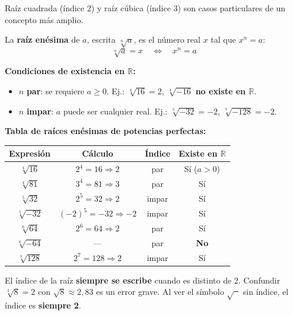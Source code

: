\documentclass[11pt, letterpaper]{article}
\begin{document}
Raíz cuadrada (índice 2) y raíz cúbica (índice 3) son casos particulares de un concepto más amplio.

\begin{tcolorbox}[importantbox, title={Definición formal de raíz enésima}]
La \textbf{raíz enésima} de $a$, escrita $\sqrt[n]{a}$, es el número real $x$ tal que $x^n = a$:
$$\sqrt[n]{a} = x \quad \Longleftrightarrow \quad x^n = a$$

\textbf{Condiciones de existencia en $\mathbb{R}$:}
\begin{itemize}
  \item $n$ \textbf{par}: se requiere $a \geq 0$. \quad Ej.: $\sqrt[4]{16}=2$, \; $\sqrt[4]{-16}$ \textbf{no existe en $\mathbb{R}$}.
  \item $n$ \textbf{impar}: $a$ puede ser cualquier real. \quad Ej.: $\sqrt[5]{-32}=-2$, \; $\sqrt[7]{-128}=-2$.
\end{itemize}

\textbf{Tabla de raíces enésimas de potencias perfectas:}
\begin{center}
\renewcommand{\arraystretch}{1.25}
\begin{tabular}{c|c|c|c}
\toprule
Expresión & Cálculo & Índice & Existe en $\mathbb{R}$\\
\midrule
$\sqrt[4]{16}$   & $2^4=16 \Rightarrow 2$      & par    & Sí ($a>0$)\\
$\sqrt[4]{81}$   & $3^4=81 \Rightarrow 3$      & par    & Sí\\
$\sqrt[5]{32}$   & $2^5=32 \Rightarrow 2$      & impar  & Sí\\
$\sqrt[5]{-32}$  & $(-2)^5=-32 \Rightarrow -2$ & impar  & Sí\\
$\sqrt[6]{64}$   & $2^6=64 \Rightarrow 2$      & par    & Sí\\
$\sqrt[6]{-64}$  & ---                          & par    & \textbf{No}\\
$\sqrt[7]{128}$  & $2^7=128 \Rightarrow 2$     & impar  & Sí\\
\bottomrule
\end{tabular}
\end{center}
\end{tcolorbox}

\begin{tcolorbox}[warningbox, title={Error frecuente}]
El índice de la raíz \textbf{siempre se escribe} cuando es distinto de 2. Confundir $\sqrt[3]{8}=2$ con $\sqrt{8}\approx 2{,}83$ es un error grave. Al ver el símbolo $\sqrt{\phantom{x}}$ sin índice, el índice es \textbf{siempre 2}.
\end{tcolorbox}
\end{document}
